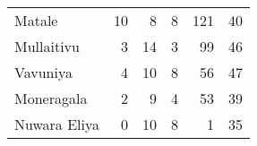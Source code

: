 \begin{tabular}{lrrrrr}
Matale       &          10 &           8 &            8 &              121 &          40 \\
Mullaitivu   &           3 &          14 &            3 &               99 &          46 \\
Vavuniya     &           4 &          10 &            8 &               56 &          47 \\
Moneragala   &           2 &           9 &            4 &               53 &          39 \\
Nuwara Eliya &           0 &          10 &            8 &                1 &          35 \\
\bottomrule
\end{tabular}
